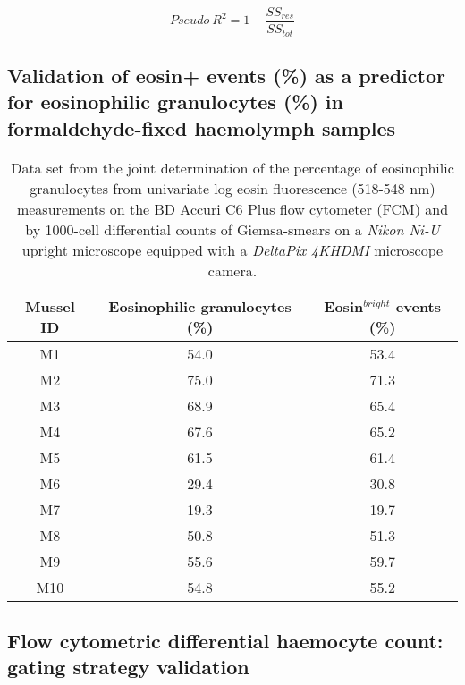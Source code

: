 \begin{equation}
\label{eq:PseudoR2}
Pseudo ~ R^2 = 1 - \dfrac{SS_{res}}{SS_{tot}}
\end{equation}


\subsection{Validation of eosin+ events (\%) as a predictor for eosinophilic granulocytes (\%) in formaldehyde-fixed haemolymph samples}

\begin{table}[H]
	\centering
	\caption{Data set from the joint determination of the percentage of eosinophilic granulocytes from univariate log eosin fluorescence (518-548 nm) measurements on the BD Accuri C6 Plus flow cytometer (FCM) and by 1000-cell differential counts of Giemsa-smears on a \emph{Nikon Ni-U} upright microscope equipped with a \emph{DeltaPix 4KHDMI} microscope camera.}
	\label{tb:LogEosin_validation}
	\begin{tabular}{ccc}
        \toprule
        Mussel ID &  Eosinophilic granulocytes (\%) & Eosin$^{bright}$ events (\%)  \\
		\midrule
M1	&	54.0    &	53.4	\\
M2	&	75.0    &	71.3	\\
M3	&	68.9	&	65.4	\\
M4	&	67.6	&	65.2	\\
M5	&	61.5	&	61.4	\\
M6	&	29.4	&	30.8	\\
M7	&	19.3	&	19.7	\\
M8	&	50.8	&	51.3	\\
M9	&	55.6	&	59.7	\\
M10	&	54.8	&	55.2	\\
   		\bottomrule
	\end{tabular}
\end{table}

\newpage

\subsection{Flow cytometric differential haemocyte count: gating strategy validation}


